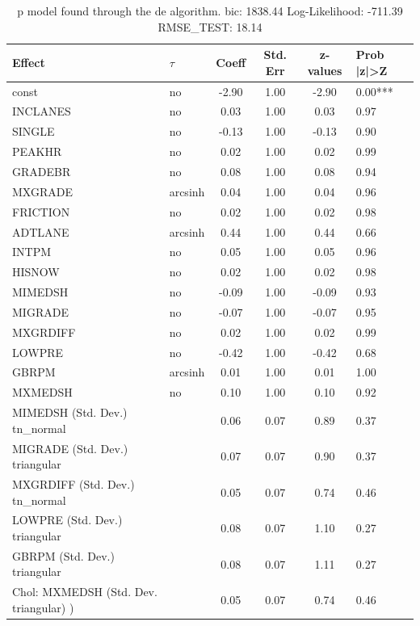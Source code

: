 \begin{table}
	\caption{p model found through the de algorithm. bic: 1838.44 Log-Likelihood: -711.39 RMSE_TEST: 18.14}
	\begin{center}
		\begin{tabular}{|l|l|c|c|c|l|}
			\hline
			Effect & $\tau$ & Coeff & Std. Err & z-values & Prob |z|>Z \\
			\hline
			const & no & -2.90 & 1.00 & -2.90 & 0.00*** \\
			\hline
			INCLANES & no & 0.03 & 1.00 & 0.03 & 0.97 \\
			\hline
			SINGLE & no & -0.13 & 1.00 & -0.13 & 0.90 \\
			\hline
			PEAKHR & no & 0.02 & 1.00 & 0.02 & 0.99 \\
			\hline
			GRADEBR & no & 0.08 & 1.00 & 0.08 & 0.94 \\
			\hline
			MXGRADE & arcsinh & 0.04 & 1.00 & 0.04 & 0.96 \\
			\hline
			FRICTION & no & 0.02 & 1.00 & 0.02 & 0.98 \\
			\hline
			ADTLANE & arcsinh & 0.44 & 1.00 & 0.44 & 0.66 \\
			\hline
			INTPM & no & 0.05 & 1.00 & 0.05 & 0.96 \\
			\hline
			HISNOW & no & 0.02 & 1.00 & 0.02 & 0.98 \\
			\hline
			MIMEDSH & no & -0.09 & 1.00 & -0.09 & 0.93 \\
			\hline
			MIGRADE & no & -0.07 & 1.00 & -0.07 & 0.95 \\
			\hline
			MXGRDIFF & no & 0.02 & 1.00 & 0.02 & 0.99 \\
			\hline
			LOWPRE & no & -0.42 & 1.00 & -0.42 & 0.68 \\
			\hline
			GBRPM & arcsinh & 0.01 & 1.00 & 0.01 & 1.00 \\
			\hline
			MXMEDSH & no & 0.10 & 1.00 & 0.10 & 0.92 \\
			\hline
			MIMEDSH (Std. Dev.) tn_normal &  & 0.06 & 0.07 & 0.89 & 0.37 \\
			\hline
			MIGRADE (Std. Dev.) triangular &  & 0.07 & 0.07 & 0.90 & 0.37 \\
			\hline
			MXGRDIFF (Std. Dev.) tn_normal &  & 0.05 & 0.07 & 0.74 & 0.46 \\
			\hline
			LOWPRE (Std. Dev.) triangular &  & 0.08 & 0.07 & 1.10 & 0.27 \\
			\hline
			GBRPM (Std. Dev.) triangular &  & 0.08 & 0.07 & 1.11 & 0.27 \\
			\hline
			 Chol: MXMEDSH (Std. Dev. triangular) ) &  & 0.05 & 0.07 & 0.74 & 0.46 \\
			\hline
		\end{tabular}
	\end{center}
\end{table}
